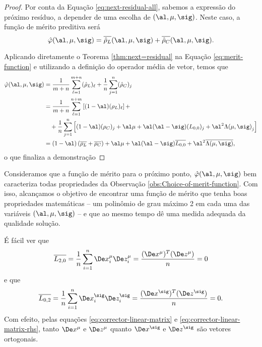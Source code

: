 \begin{proof}  Por conta da Equação \eqref{eq:next-residual-all}, sabemos a expressão do
próximo resíduo, a depender de uma escolha de $(\al,\mu,\sig)$. Neste caso, 
a função de mérito preditiva será
\begin{equation}
\label{eq:merit-function}
\nextphi(\al,\mu,\sig) =
\dbvec{\hat{\rho}_L}(\al,\mu,\sig)+
\dbvec{\hat{\rho}_C}(\al,\mu,\sig).
\end{equation}

 Aplicando diretamente o Teorema \ref{thm:next=residual} na
Equação \eqref{eq:merit-function} e utilizando a definição do operador média de vetor, temos que
 \[
\begin{aligned}
\nextphi(\al,\mu,\sig) & =
\frac{1}{m+n}\sum_{\ell=1}^{m+n}(\hat{\rho}_L)_\ell +
\frac{1}{n}\sum_{j=1}^{n}(\hat{\rho}_C)_j \\
						 & = \frac{1}{m+n}\sum_{\ell=1}^{n+m}\left[(1-\al)(\rho_L)_\ell 
						 \right] +
						 \\
				 	 & \quad  + \frac{1}{n}\sum_{j=1}^{n}  \left[ (1-\al)(\rho_C)_j +
				 	 \al\mu + \al(\al-\sig)(L_{0,0})_j + \al^2{\Lambda(\mu,\sig)}_j \right] \\
				 	 & = (1-\al)\left(\dbvec{\rho_L} + \dbvec{\rho_C}\right) + \al\mu +
\al(\al-\sig)\dbvec{L_{0,0}} + \al^2\dbvec{\Lambda(\mu,\sig)},	
\end{aligned}
\]
o que finaliza a demonstração
\end{proof}


Consideramos que a função de mérito para o próximo ponto, $\nextphi(\al,\mu,\sig) $ bem caracteriza todas propriedades da Observação \ref{obs:Choice-of-merit-function}. Com isso, alcançamos o objetivo de encontrar uma função de mérito que tenha boas propriedades matemáticas -- um polinômio de grau máximo 2 em cada uma das variáveis $(\al,\mu,\sig)$ --  e que ao mesmo tempo dê uma medida adequada da qualidade solução.


\begin{obs}\label{obs:L_02-L20}
É fácil ver que   \[\dbvec{L_{2,0}} = \frac{1}{n} \sum_{i=1}^n
\Dex_i^\mu\Dez_i^\mu = \frac{(\Dex^\mu)^T(\Dez^\mu)}{n} = 0\] e que  
  \[\dbvec{L_{0,2}} = \frac{1}{n} \sum_{i=1}^n
\Dex_i^\sig\Dez_i^\sig = \frac{(\Dex^\sig)^T(\Dez^\sig)}{n} = 0.\] 
Com efeito, pelas equações \eqref{eq:corrector-linear-matrix} e \eqref{eq:corrector-linear-matrix-rhs},
 tanto $\Dex^\mu$ e $\Dez^\mu$ quanto $\Dex^\sig$ e $\Dez^\sig$ são vetores ortogonais. 


\end{obs}


